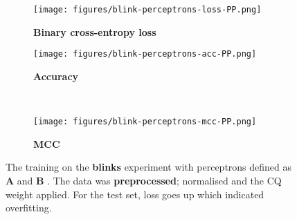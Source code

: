 \begin{figure}[h]
    \centering
    \begin{subfigure}{0.5\linewidth}
        \centering
        \captionsetup{width = 0.9\linewidth}
        \texttt{[image: figures/blink-perceptrons-loss-PP.png]}
        \caption{\textbf{Binary cross-entropy loss}}
        \label{fig:blink-perceptrons-loss-PP}
    \end{subfigure}%
    \begin{subfigure}{0.5\linewidth}
        \centering
        \captionsetup{width = 0.9\linewidth}
        \texttt{[image: figures/blink-perceptrons-acc-PP.png]}
        \caption{\textbf{Accuracy}}
        \label{fig:blink-perceptrons-acc-PP}
    \end{subfigure}%
    \\
    \begin{subfigure}{0.5\linewidth}
        \captionsetup{width = 0.9\linewidth}
        \texttt{[image: figures/blink-perceptrons-mcc-PP.png]}
        \caption{\textbf{MCC}}
        \label{fig:/blink-perceptrons-mcc-PP}
    \end{subfigure}%
    \begin{minipage}{0.5\linewidth}
        \caption{The training on the \textbf{blinks} experiment with perceptrons defined as \textbf{A} and \textbf{B} . The data was \textbf{preprocessed}; normalised and the CQ weight applied. For the test set, loss goes up which indicated overfitting.}
        \label{fig:blink-perceptrons-PP}
    \end{minipage}
\end{figure}